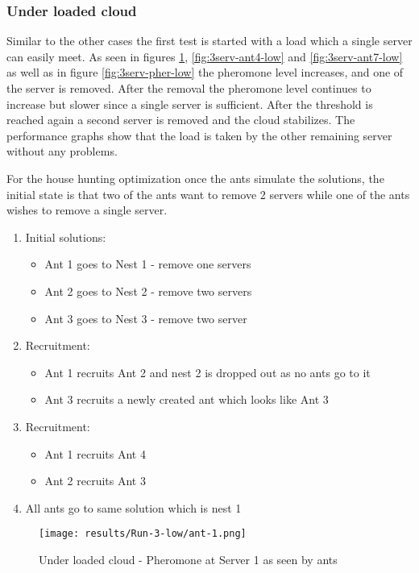 \subsubsection{Under loaded cloud}

Similar to the other cases the first test is started with a load which a single server can easily meet. As seen in figures \ref{fig:3serv-ant1-low}, \ref{fig:3serv-ant4-low} and \ref{fig:3serv-ant7-low} as well as in figure \ref{fig:3serv-pher-low} the pheromone level increases, and one of the server is removed. After the removal the pheromone level continues to increase but slower since a single server is sufficient. After the threshold is reached again a second server is removed and the cloud stabilizes. The performance graphs show that the load is taken by the other remaining server without any problems.

For the house hunting optimization once the ants simulate the solutions, the initial state is that two of the ants want to remove 2 servers while one of the ants wishes to remove a single server.

\begin{enumerate}
	\item Initial solutions: 
	\begin{itemize}
		\item Ant 1 goes to Nest 1 - remove one servers
		\item Ant 2 goes to Nest 2 - remove two servers
		\item Ant 3 goes to Nest 3 - remove two server
	\end{itemize}
	\item Recruitment:
	\begin{itemize}
		\item Ant 1 recruits Ant 2 and nest 2 is dropped out as no ants go to it
		\item Ant 3 recruits a newly created ant which looks like Ant 3
	\end{itemize}
	\item Recruitment:
	\begin{itemize}
		\item Ant 1 recruits Ant 4
		\item Ant 2 recruits Ant 3
	\end{itemize}
	\item All ants go to same solution which is nest 1
\end{enumerate}

\begin{figure}[!ht]
	\centering
		\texttt{[image: results/Run-3-low/ant-1.png]}
	\caption{Under loaded cloud - Pheromone at Server 1 as seen by ants}
	\label{fig:3serv-ant1-low}
\end{figure}

